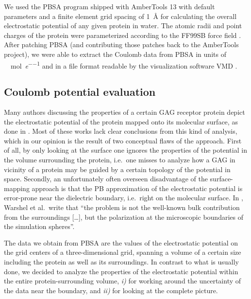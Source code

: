 We used the PBSA program shipped with AmberTools 13 \cite{case_amber_12} with
default parameters and a finite element grid spacing of \SI{1}{\angstrom} for
calculating the overall electrostatic potential of any given protein in water.
The atomic radii and point charges of the protein were parameterized according
to the FF99SB force field \cite{case_amber_12}. After patching PBSA (and
contributing those patches back to the AmberTools project), we were able to
extract the Coulomb data from PBSA in units of
\si{\kilo\calory\per\mole\per\elementarycharge} and in a file format readable by
the visualization software VMD \cite{vmd_1996}.

\subsection{Coulomb potential evaluation}

Many authors discussing the properties of a certain GAG receptor protein depict
the electrostatic potential of the protein mapped onto its molecular surface, as
done in \cite{rogers_gag_prot_prot_2011,%
Gandhi01102009,sapay_hs_growthfactors_2011,%
gandhi_bmp_heparin_binding_sites_2012,sost_heparin_2009,%
catK_cs4_crystal_structure_2008,hydrolase_gags_2011,gandhi_structure_2008,%
imberty_gag_prot_carbres_2007,gags_as_polyelectrolytes_2010}. Most of these
works lack clear conclusions from this kind of analysis, which in our opinion is
the result of two conceptual flaws of the approach. First of all, by only
looking at the surface one ignores the properties of the potential in the volume
surrounding the protein, i.e.\ one misses to analyze how a GAG in vicinity of a
protein may be guided by a certain topology of the potential in space. Secondly,
an unfortunately often overseen disadvantage of the surface-mapping approach is
that the PB approximation of the electrostatic potential is
 error-prone near the dielectric boundary, i.e.\ right on the
molecular surface. In \cite{estatic_proteins_warshel_2006}, Warshel et al.\
write that \enquote{the problem is not the well-known bulk contribution from the
surroundings [\dots], but the polarization at the microscopic boundaries of the
simulation spheres}.

The data we obtain from PBSA are the values of the electrostatic potential on
the grid centers of a three-dimensional grid, spanning a volume of a certain
size including the protein as well as its surroundings. In contrast to what is
usually done, we decided to analyze the properties of the electrostatic
potential within the entire protein-surrounding volume, \textit{i)} for working
around the uncertainty of the data near the boundary, and \textit{ii)} for
looking at the complete picture.

